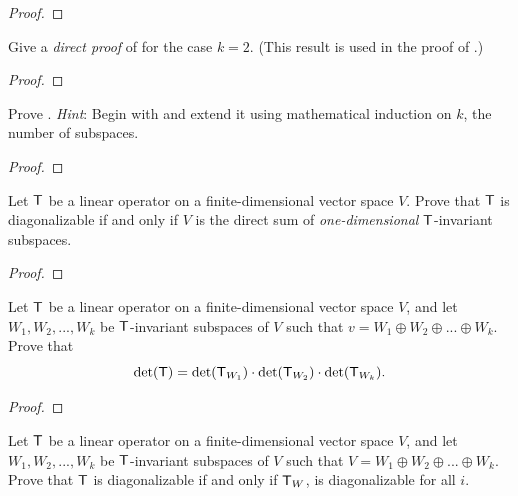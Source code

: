 \begin{proof}
\end{proof}

\begin{exercise} \label{exercise 5.4.33}
Give a \emph{direct proof} of  for the case \(k = 2\).
(This result is used in the proof of .)
\end{exercise}

\begin{proof}
\end{proof}

\begin{exercise} \label{exercise 5.4.34}
Prove .
\emph{Hint}: Begin with  and extend it using mathematical induction on \(k\), the number of subspaces.
\end{exercise}

\begin{proof}
\end{proof}

\begin{exercise} \label{exercise 5.4.35}
Let \(\textsf{T}\) be a linear operator on a finite-dimensional vector space \(V\).
Prove that \(\textsf{T}\) is diagonalizable if and only if \(V\) is the direct sum of \emph{one-dimensional} \(\textsf{T}\)-invariant subspaces.
\end{exercise}

\begin{proof}
\end{proof}

\begin{exercise} \label{exercise 5.4.36}
Let \(\textsf{T}\) be a linear operator on a finite-dimensional vector space \(V\), and let \(W_1, W_2, ..., W_k\) be \(\textsf{T}\)-invariant subspaces of \(V\) such that \(v = W_1 \oplus W_2 \oplus ... \oplus W_k\).
Prove that
\[
    \det(\textsf{T}) = \det(\textsf{T}_{W_1}) \cdot \det(\textsf{T}_{W_2}) \cdot \det(\textsf{T}_{W_k}).
\]
\end{exercise}

\begin{proof}
\end{proof}

\begin{exercise} \label{exercise 5.4.37}
Let \(\textsf{T}\) be a linear operator on a finite-dimensional vector space \(V\), and let \(W_1, W_2, ..., W_k\) be \(\textsf{T}\)-invariant subspaces of \(V\) such that \(V = W_1 \oplus W_2 \oplus ... \oplus W_k\).
Prove that \(\textsf{T}\) is diagonalizable if and only if \(\textsf{T}_W\), is diagonalizable for all \(i\).
\end{exercise}


